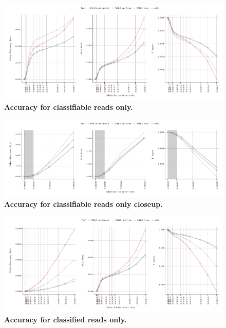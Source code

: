 \documentclass[10pt,twocolumn]{article}
\begin{document}
\begin{figure}[htbp]
\centering
\includegraphics[keepaspectratio,scale=1]{../plot/3_classifiable_accuracy_0550}
\caption{\footnotesize{\textbf{Accuracy for classifiable reads only.} } }
\label{fig:03}
\end{figure}

\begin{figure}[htbp]
\centering
\includegraphics[keepaspectratio,scale=1]{../plot/4_classifiable_accuracy_0060}
\caption{\footnotesize{\textbf{Accuracy for classifiable reads only closeup.} } }
\label{fig:04}
\end{figure}

\begin{figure}[htbp]
\centering
\includegraphics[keepaspectratio,scale=1]{../plot/5_classified_accuracy_0550}
\caption{\footnotesize{\textbf{Accuracy for classified reads only.} } }
\label{fig:05}
\end{figure}
\end{document}
